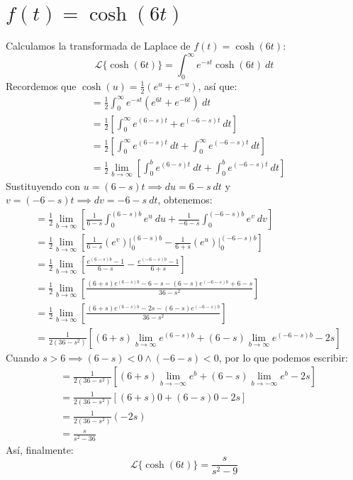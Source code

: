 \documentclass[12pt, a4paper]{article}
\begin{document}
\section{\texorpdfstring{\(f(t)=\cosh(6t)\)}{f (t) = cosh (6t)}}

Calculamos la transformada de Laplace de \(f(t) = \cosh(6t)\):
\[
	\mathcal{L}\{\cosh(6t)\} = \int_{0}^{\infty} e^{-st} \cosh(6t) \ dt
\]
Recordemos que \(\cosh(u) = \frac{1}{2} \left( e^{u} + e^{-u} \right) \), así que:
\begin{align*}
	&= \frac{1}{2} \int_{0}^{\infty} e^{-st} \left( e^{6t} + e^{-6t} \right)  \ dt \\
	&= \frac{1}{2} \left[ \int_{0}^{\infty} e^{(6-s)t} + e^{(-6-s)t} \ dt \right] \\
	&= \frac{1}{2} \left[ \int_{0}^{\infty} e^{(6-s)t} \ dt + \int_{0}^{\infty} e^{(-6-s)t} \ dt \right] \\
	&= \frac{1}{2} \lim_{b \to \infty} \left[ \int_{0}^{b} e^{(6-s)t} \ dt + \int_{0}^{b} e^{(-6-s)t} \ dt \right]
\end{align*}
Sustituyendo con \(u = (6-s)t \implies du = 6-s\ dt\) y \(v = (-6-s)t \implies dv = -6-s\ dt\), obtenemos:
\begin{align*}
	&= \frac{1}{2} \lim_{b \to \infty} \left[ \frac{1}{6-s} \int_{0}^{(6-s)b} e^{u} \ du + \frac{1}{-6-s} \int_{0}^{(-6-s)b} e^{v} \ dv \right] \\
	&= \frac{1}{2} \lim_{b \to \infty} \left[ \frac{1}{6-s} \left. \left( e^{v} \right) \right|_{0}^{(6-s)b} - \frac{1}{6+s} \left. \left( e^{u} \right) \right|_{0}^{(-6-s)b} \right] \\
	&= \frac{1}{2} \lim_{b \to \infty} \left[ \frac{e^{(6-s)b} - 1}{6-s} - \frac{e^{(-6-s)b} - 1}{6+s} \right] \\
	&= \frac{1}{2} \lim_{b \to \infty} \left[ \frac{(6+s) e^{(6-s)b} - 6 - s - (6-s)e^{(-6-s)b} + 6 - s}{36 - s ^{2}} \right] \\
	&= \frac{1}{2} \lim_{b \to \infty} \left[ \frac{(6+s) e^{(6-s)b} - 2s - (6-s)e^{(-6-s)b}}{36-s ^{2}} \right] \\
	&= \frac{1}{2(36-s ^{2})} \left[ (6+s) \lim_{b \to \infty} e^{(6-s)b} + (6-s) \lim_{b \to \infty} e^{(-6-s)b} - 2s \right]
\end{align*}
Cuando \(s > 6 \implies (6-s) < 0 \land (-6-s) < 0\), por lo que podemos escribir:
\begin{align*}
	&= \frac{1}{2(36-s ^{2})} \left[ (6+s) \lim_{b \to -\infty} e^{b} + (6-s) \lim_{b \to -\infty} e^{b} - 2s \right] \\
	&= \frac{1}{2(36-s ^{2})} \left[ (6+s) 0 + (6-s) 0 - 2s \right] \\
	&= \frac{1}{2(36-s ^{2})} (-2s) \\
	&= \frac{s}{s ^{2} - 36}
\end{align*}
Así, finalmente:
\[
	\mathcal{L}\{\cosh(6t)\} = \frac{s}{s ^{2} - 9}
\]
\end{document}
